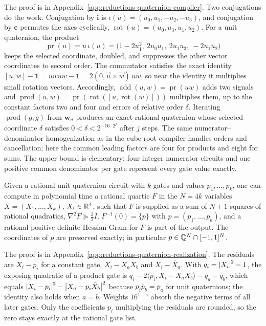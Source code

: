 The proof is in Appendix~\ref{app:reductions-quaternion-compiler}. Two
conjugations do the work. Conjugation by $\mathbf i$ is
$\iota(u)=(u_0,u_1,-u_2,-u_3)$, and conjugation by $\mathbf c$ permutes the axes
cyclically, $\operatorname{rot}(u)=(u_0,u_3,u_1,u_2)$. For a unit quaternion,
the product
\[
 \operatorname{pr}(u)=u\,\iota(u)=\bigl(1-2u_1^2,\ 2u_0u_1,\ 2u_1u_3,\ -2u_1u_2\bigr)
\]
keeps the selected coordinate, doubled, and suppresses the other vector
coordinates to second order. The commutator satisfies the exact identity
$[u,w]-\mathbf1=uw\bar u\bar w-\mathbf1=2(0,\vec u\times\vec w)\,\bar u\bar w$, so
near the identity it multiplies small rotation vectors. Accordingly,
$\operatorname{add}(u,w)=\operatorname{pr}(uw)$ adds two signals and
$\operatorname{prod}(u,w)=\operatorname{pr}(\operatorname{rot}([u,\operatorname{rot}(w)]))$
multiplies them, up to the constant factors two and four and errors of
relative order $\delta$. Iterating $\operatorname{prod}(g,g)$ from
$\mathbf w_\vartheta$ produces an exact rational quaternion whose selected
coordinate $\delta$ satisfies $0<\delta<2^{-16\cdot2^j}$ after $j$ steps. The same numerator--denominator homogenization as in the cube-root
compiler handles orders and cancellation; here the common leading factors are
four for products and eight for sums. The upper bound is elementary: four
integer numerator circuits and one positive common denominator per gate
represent every gate value exactly.

\begin{proposition}
\label{prop:reductions-quaternion-realization}
Given a rational unit-quaternion circuit with $k$ gates and values
$p_1,\ldots,p_k$, one can compute in polynomial time a rational quartic $F$ in
the $N=4k$ variables $X=(X_1,\ldots,X_k)$, $X_i\in\mathbb R^4$, such that $F$ is
supplied as a sum of $N+1$ squares of rational quadratics,
$\nabla^2F\succeq\frac32I$, $F^{-1}(0)=\{p\}$ with $p=(p_1,\ldots,p_k)$, and a
rational positive definite Hessian Gram for $F$ is part of the output. The
coordinates of $p$ are preserved exactly; in particular $p\in\mathbb Q^N\cap[-1,1]^N$.
\end{proposition}

The proof is in Appendix~\ref{app:reductions-quaternion-realization}. The
residuals are $X_i-p_i$ for a constant gate, $X_i-X_aX_b$ and $X_i-\bar X_a$. With
$q_i=\left\lvert X_i\right\rvert^2-1$, the exposing quadratic of a product gate is
$q_i-2\langle p_i,X_i-X_aX_b\rangle-q_a-q_b$, which equals
$\left\lvert X_i-p_i\right\rvert^2-\left\lvert X_a-p_i\bar X_b\right\rvert^2$ because $p_i\bar p_b=p_a$ for unit
quaternions; the identity also holds when $a=b$. Weights $16^{1-i}$ absorb the
negative terms of all later gates. Only the coefficients $p_i$ multiplying the
residuals are rounded, so the zero stays exactly at the rational gate list.

